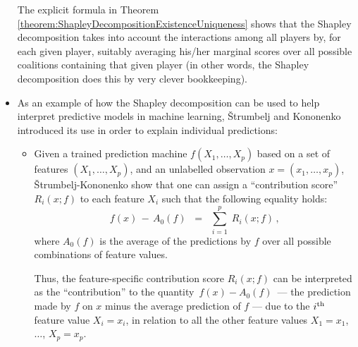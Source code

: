 \begin{itemize}
	The explicit formula in
	Theorem \ref{theorem:ShapleyDecompositionExistenceUniqueness}
	shows that the Shapley decomposition takes into account
	the interactions among all players by,
	for each given player, {\color{red}suitably averaging} his/her {\color{red}marginal scores}
	over all possible coalitions containing that given player
	(in other words, the Shapley decomposition does this by very clever bookkeeping).

\item
	As an example of how the Shapley decomposition can be used
	to help interpret predictive models in machine learning,
	\v{S}trumbelj and Kononenko \cite{Strumbelj2010}
	introduced its use in order to {\color{red}explain individual predictions}:
	\begin{itemize}
	\item
		Given a trained prediction machine $f(X_{1},\ldots,X_{p})$
		based on a set of features $(X_{1},\ldots,X_{p})$, and
		an unlabelled observation $x = (x_{1},\ldots,x_{p})$,
		\v{S}trumbelj-Kononenko \cite{Strumbelj2010} show that
		one can assign a ``contribution score'' $R_{i}(x;f)$ to each feature $X_{i}$
		such that the following equality holds:
		\begin{equation*}
		f(x) \, - \, A_{0}(f)
		\;\; = \;\;
			\overset{p}{\underset{i=1}{\sum}}\;
			R_{i}(x;f)\,,
		\end{equation*}
		where $A_{0}(f)$ is the average of the predictions by $f$
		over all possible combinations of feature values.

		Thus, the feature-specific contribution score $R_{i}(x;f)$ can be interpreted
		as the ``{\color{red}contribution}'' to the quantity \,$f(x) - A_{0}(f)$\,
		 --- the prediction made by $f$ on $x$ minus the average prediction of $f$ ---
		due to the $i^{\textnormal{th}}$ feature value $X_{i} = x_{i}$,
		in relation to all the other feature values
		$X_{1} = x_{1}$, \,$\ldots$\;, $X_{p} = x_{p}$.


\end{itemize}
\end{itemize}
